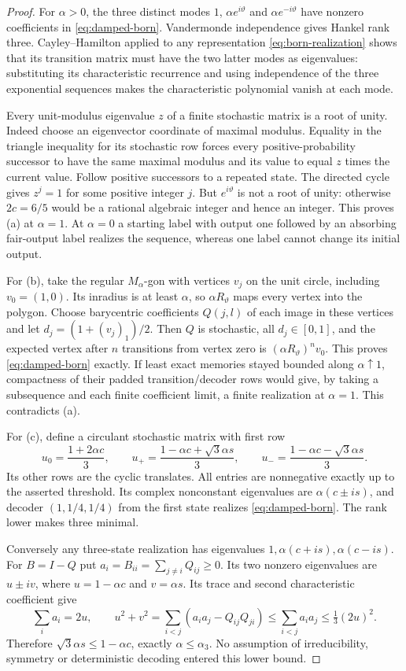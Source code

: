 \begin{proof}
For $\alpha>0$, the three distinct modes $1$, $\alpha e^{i\vartheta}$ and $\alpha e^{-i\vartheta}$ have nonzero coefficients in \eqref{eq:damped-born}. Vandermonde independence gives Hankel rank three. Cayley--Hamilton applied to any representation \eqref{eq:born-realization} shows that its transition matrix must have the two latter modes as eigenvalues: substituting its characteristic recurrence and using independence of the three exponential sequences makes the characteristic polynomial vanish at each mode.

Every unit-modulus eigenvalue $z$ of a finite stochastic matrix is a root of unity. Indeed choose an eigenvector coordinate of maximal modulus. Equality in the triangle inequality for its stochastic row forces every positive-probability successor to have the same maximal modulus and its value to equal $z$ times the current value. Follow positive successors to a repeated state. The directed cycle gives $z^j=1$ for some positive integer $j$. But $e^{i\vartheta}$ is not a root of unity: otherwise $2c=6/5$ would be a rational algebraic integer and hence an integer. This proves (a) at $\alpha=1$. At $\alpha=0$ a starting label with output one followed by an absorbing fair-output label realizes the sequence, whereas one label cannot change its initial output.

For (b), take the regular $M_\alpha$-gon with vertices $v_j$ on the unit circle, including $v_0=(1,0)$. Its inradius is at least $\alpha$, so $\alpha R_\vartheta$ maps every vertex into the polygon. Choose barycentric coefficients $Q(j,l)$ of each image in these vertices and let $d_j=(1+(v_j)_1)/2$. Then $Q$ is stochastic, all $d_j\in[0,1]$, and the expected vertex after $n$ transitions from vertex zero is $(\alpha R_\vartheta)^nv_0$. This proves \eqref{eq:damped-born} exactly. If least exact memories stayed bounded along $\alpha\uparrow1$, compactness of their padded transition/decoder rows would give, by taking a subsequence and each finite coefficient limit, a finite realization at $\alpha=1$. This contradicts (a).

For (c), define a circulant stochastic matrix with first row
\[
 u_0=\frac{1+2\alpha c}{3},\qquad
 u_+=\frac{1-\alpha c+\sqrt3\alpha s}{3},\qquad
 u_-=\frac{1-\alpha c-\sqrt3\alpha s}{3}.
\]
Its other rows are the cyclic translates. All entries are nonnegative exactly up to the asserted threshold. Its complex nonconstant eigenvalues are $\alpha(c\pm is)$, and decoder $(1,1/4,1/4)$ from the first state realizes \eqref{eq:damped-born}. The rank lower makes three minimal.

Conversely any three-state realization has eigenvalues $1,\alpha(c+is),\alpha(c-is)$. For $B=I-Q$ put $a_i=B_{ii}=\sum_{j\ne i}Q_{ij}\ge0$. Its two nonzero eigenvalues are $u\pm iv$, where $u=1-\alpha c$ and $v=\alpha s$. Its trace and second characteristic coefficient give
\[
 \sum_i a_i=2u,\qquad
 u^2+v^2=\sum_{i<j}(a_ia_j-Q_{ij}Q_{ji})
       \le\sum_{i<j}a_ia_j\le\tfrac13(2u)^2.
\]
Therefore $\sqrt3\alpha s\le1-\alpha c$, exactly $\alpha\le\alpha_3$. No assumption of irreducibility, symmetry or deterministic decoding entered this lower bound.
\end{proof}

